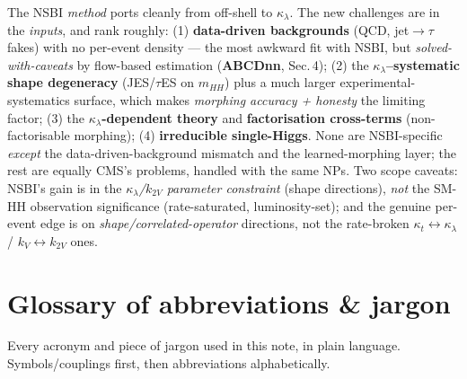 \documentclass[11pt]{article}
\newcommand{\kl}{\ensuremath{\kappa_\lambda}}
\newcommand{\mhh}{\ensuremath{m_{HH}}}
\begin{document}
\begin{takeaway}
The NSBI \emph{method} ports cleanly from off-shell to \kl. The new challenges are in the \emph{inputs}, and rank
roughly: (1) \textbf{data-driven backgrounds} (QCD, jet$\to\tau$ fakes) with no per-event density --- the most
awkward fit with NSBI, but \emph{solved-with-caveats} by flow-based estimation (\textbf{ABCDnn}, Sec.\,4); (2) the
\textbf{\kl--systematic shape degeneracy} (JES/$\tau$ES on \mhh) plus a much larger experimental-systematics
surface, which makes \emph{morphing accuracy + honesty} the limiting factor; (3) the \textbf{\kl-dependent theory}
and \textbf{factorisation cross-terms} (non-factorisable morphing); (4) \textbf{irreducible single-Higgs}. None are
NSBI-specific \emph{except} the data-driven-background mismatch and the learned-morphing layer; the rest are equally
CMS's problems, handled with the same NPs. Two scope caveats: NSBI's gain is in the \emph{\kl/$k_{2V}$ parameter
constraint} (shape directions), \emph{not} the SM-HH observation significance (rate-saturated, luminosity-set);
and the genuine per-event edge is on \emph{shape/correlated-operator} directions, not the rate-broken
$\kappa_t\!\leftrightarrow\!\kl$ / $k_V\!\leftrightarrow\!k_{2V}$ ones.
\end{takeaway}

\section*{Glossary of abbreviations \& jargon}
\noindent\small Every acronym and piece of jargon used in this note, in plain language. Symbols/couplings first,
then abbreviations alphabetically.\normalsize
\end{document}
